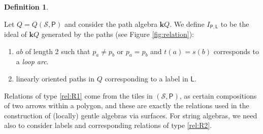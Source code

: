 \documentclass[11pt]{amsart}
\numberwithin{equation}{section}
\theoremstyle{definition}
\newtheorem{definition}[theorem]{Definition}
\begin{document}
\begin{definition}\label{def:tiled surface}

Let $Q = Q(\mathcal{S}, \mathsf{P})$ and consider the path algebra $\mathbf{k}Q$. 
We define $I_{\mathsf{P},\mathsf{L}}$ to be the ideal of $\mathbf{k}Q$ generated by the paths (see Figure \ref{fig:relation}):

\begin{enumerate}[label=(\text{R}\arabic*), ref=(\text{R}\arabic*)]
    \item \label{rel:R1} $ab$ of length 2 such that $p_a \neq p_b$ or $p_a = p_b$ and $t(a) = s(b)$ corresponds to a \textit{loop arc}.
    
    \item \label{rel:R2} linearly oriented paths in $Q$ corresponding to a label in $\mathsf{L}$.
\end{enumerate}
 
Relations of type \ref{rel:R1} come from the tiles in \( (\mathcal{S}, \mathsf{P}) \), as certain compositions of two arrows within a polygon, and these are exactly the relations used in the construction of (locally) gentle algebras via surfaces. For string algebras, we need also to consider labels and corresponding relations of type \ref{rel:R2}.
 \begin{figure}[htbp]
\end{figure}
\end{definition}
\end{document}
